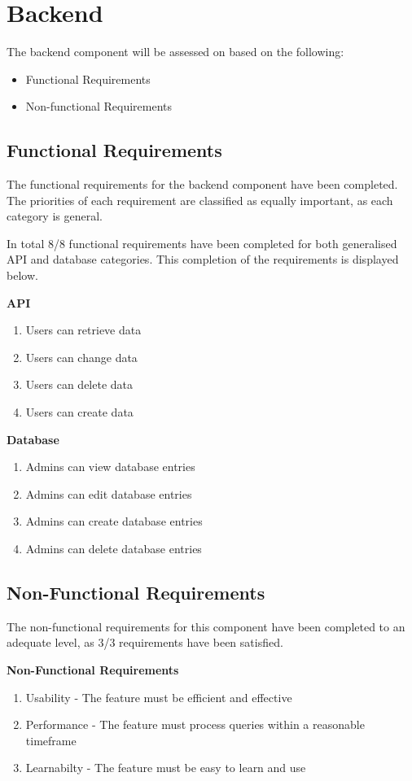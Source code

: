 \section{Backend}
The backend component will be assessed on based on the following:

\begin{itemize}
    \item Functional Requirements
    \item Non-functional Requirements
\end{itemize}

\subsection{Functional Requirements}
The functional requirements for the backend component have been completed. The priorities of each requirement are classified as equally important, as each category is general. 

In total 8/8 functional requirements have been completed for both generalised API and database categories. This completion of the requirements is displayed below.

\textbf{API}
\begin{enumerate}
    \item Users can retrieve data
    \item Users can change data
    \item Users can delete data
    \item Users can create data
\end{enumerate}
    
\textbf{Database}
\begin{enumerate}
    \item Admins can view database entries
    \item Admins can edit database entries
    \item Admins can create database entries
    \item Admins can delete database entries
\end{enumerate}

\subsection{Non-Functional Requirements}
The non-functional requirements for this component have been completed to an adequate level, as 3/3 requirements have been satisfied. 

\textbf{Non-Functional Requirements}
  \begin{enumerate}
    \item Usability - The feature must be efficient and effective
    \item Performance - The feature must process queries within a reasonable timeframe
    \item Learnabilty - The feature must be easy to learn and use
\end{enumerate}

